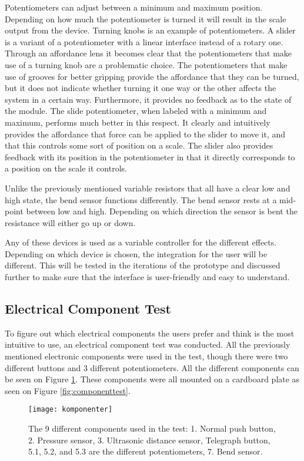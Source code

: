 Potentiometers can adjust between a minimum and maximum position. Depending on how much the potentiometer is turned it will result in the scale output from the device. Turning knobs is an example of potentiometers. A slider is a variant of a potentiometer with a linear interface instead of a rotary one. Through an affordance lens it becomes clear that the potentiometers that make use of a turning knob are a problematic choice. The potentiometers that make use of grooves for better gripping provide the affordance that they can be turned, but it does not indicate whether turning it one way or the other affects the system in a certain way. Furthermore, it provides no feedback as to the state of the module. The slide potentiometer, when labeled with a minimum and maximum, performs much better in this respect. It clearly and intuitively provides the affordance that force can be applied to the slider to move it, and that this controls some sort of position on a scale. The slider also provides feedback with its position in the potentiometer in that it directly corresponds to a position on the scale it controls. 

Unlike the previously mentioned variable resistors that all have a clear low and high state, the bend sensor functions differently. The bend sensor rests at a mid-point between low and high. Depending on which direction the sensor is bent the resistance will either go up or down.

Any of these devices is used as a variable controller for the different effects. Depending on which device is chosen, the integration for the user will be different. This will be tested in the iterations of the prototype and discussed further to make sure that the interface is user-friendly and easy to understand. 

\subsection{Electrical Component Test}\label{sec:comptest}
To figure out which electrical components the users prefer and think is the most intuitive to use, an electrical component test was conducted. All the previously mentioned electronic components were used in the test, though there were two different buttons and 3 different potentiometers. All the different components can be seen on Figure \ref{fig:komponenter}. These components were all mounted on a cardboard plate as seen on Figure \ref{fig:componenttest}.

\begin{figure}[!h] 
\centering
\texttt{[image: komponenter]}
\caption{\label{fig:komponenter} The 9 different components used in the test: 1. Normal push button, 2. Pressure sensor, 3. Ultrasonic distance sensor, Telegraph button, 5.1, 5.2, and 5.3 are the different potentiometers, 7. Bend sensor.}
\end{figure}

